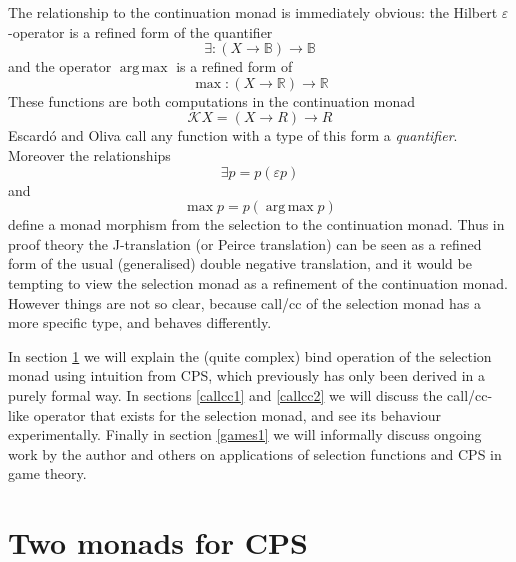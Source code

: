 \documentclass{article}
\newcommand\B{\mathbb B}
\newcommand\R{\mathbb R}
\newcommand\K{\mathscr K}
\renewcommand\epsilon\varepsilon
\newcommand\argmax{\operatorname{arg\,max}}
\begin{document}
The relationship to the continuation monad is immediately obvious: the Hilbert $\epsilon$-operator is a refined form of the quantifier
\[ \exists : (X \to \B) \to \B \]
and the operator $\argmax$ is a refined form of
\[ \max : (X \to \R) \to \R \]
These functions are both computations in the continuation monad
\[ \K X = (X \to R) \to R \]
Escard\'o and Oliva call any function with a type of this form a \emph{quantifier}. Moreover the relationships
\[ \exists p = p (\epsilon p) \]
and
\[ \max p = p (\argmax p) \]
define a monad morphism from the selection to the continuation monad. Thus in proof theory the J-translation (or Peirce translation) \citep{escardo12b} can be seen as a refined form of the usual (generalised) double negative translation, and it would be tempting to view the selection monad as a refinement of the continuation monad. However things are not so clear, because call/cc of the selection monad has a more specific type, and behaves differently.

In section \ref{monads} we will explain the (quite complex) bind operation of the selection monad using intuition from CPS, which previously has only been derived in a purely formal way. In sections \ref{callcc1} and \ref{callcc2} we will discuss the call/cc-like operator that exists for the selection monad, and see its behaviour experimentally. Finally in section \ref{games1} we will informally discuss ongoing work by the author and others on applications of selection functions and CPS in game theory. 

\section{Two monads for CPS}\label{monads}
\end{document}
